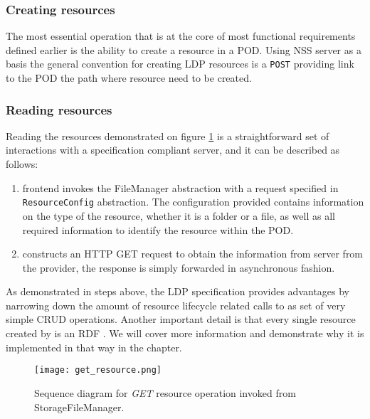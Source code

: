 \subsubsection{Creating resources}

The most essential operation that is at the core of most functional requirements defined earlier is the ability to create a resource in a POD. Using NSS server as a basis the general convention for creating LDP resources is a \texttt{POST}  providing  link to the POD  the path where resource need to be created. 

\subsubsection{Reading resources}

Reading the resources demonstrated on figure \ref{fig:lps_get_resource_sequence} is a straightforward set of interactions with a \solid{} specification compliant server, and it can be described as follows:

\begin{enumerate}
    \item \lpa{} frontend invokes the FileManager abstraction with a request specified in \texttt{ResourceConfig} abstraction. The configuration provided contains information on the type of the resource, whether it is a folder or a file, as well as all required information to identify the resource within the POD.
    \item \lpas{} constructs an HTTP GET request to obtain the information from \solid{} server from the provider, the response is simply forwarded in asynchronous fashion.
\end{enumerate}

As demonstrated in  steps above, the LDP specification provides advantages by narrowing down the amount of resource lifecycle related calls to as set of very simple CRUD operations. Another important detail is that every single resource created by \lpas{} is an RDF . We will cover more information and demonstrate why it is implemented in that way in the  chapter.  
 
\begin{figure}[h]
\centering
\texttt{[image: get\_resource.png]}
\caption{Sequence diagram for \textit{GET} resource operation invoked from StorageFileManager.}
\label{fig:lps_get_resource_sequence}
\end{figure}

